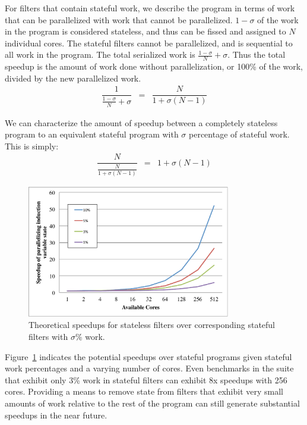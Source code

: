 For filters that contain stateful work, we describe the program in terms of work that can be parallelized with work that cannot be parallelized.  $1-\sigma$ of the work in the program is considered stateless, and thus can be fissed and assigned to $N$ individual cores.  The stateful filters cannot be parallelized, and is sequential to all work in the program.  The total serialized work is $\frac{1-\sigma}{N} + \sigma$.  Thus the total speedup is the amount of work done without parallelization, or 100\% of the work, divided by the new parallelized work.  
\begin{eqnarray*}
\dfrac{1}{\frac{1-\sigma}{N} + \sigma} &=& \dfrac{N}{1 + \sigma(N-1)}
\end{eqnarray*}

We can characterize the amount of speedup between a completely stateless program to an equivalent stateful program with $\sigma$ percentage of stateful work.  This is simply:
\begin{eqnarray*}
\dfrac{N}{\frac{N}{1 + \sigma(N-1)}} &=& 1 + \sigma(N-1)
\end{eqnarray*}



\begin{figure}[t]
\includegraphics[width=3.5in]{figures/theoretic-speedup.pdf}
\caption{Theoretical speedups for stateless filters over corresponding stateful filters with $\sigma$\% work.  \protect\label{fig:theo-speedups}}
\end{figure}

Figure~\ref{fig:theo-speedups} indicates the potential speedups over stateful programs given stateful work percentages and a varying number of cores.  Even benchmarks in the suite that exhibit only 3\% work in stateful filters can exhibit 8x speedups with 256 cores.  Providing a means to remove state from filters that exhibit very small amounts of work relative to the rest of the program can still generate substantial speedups in the near future.



